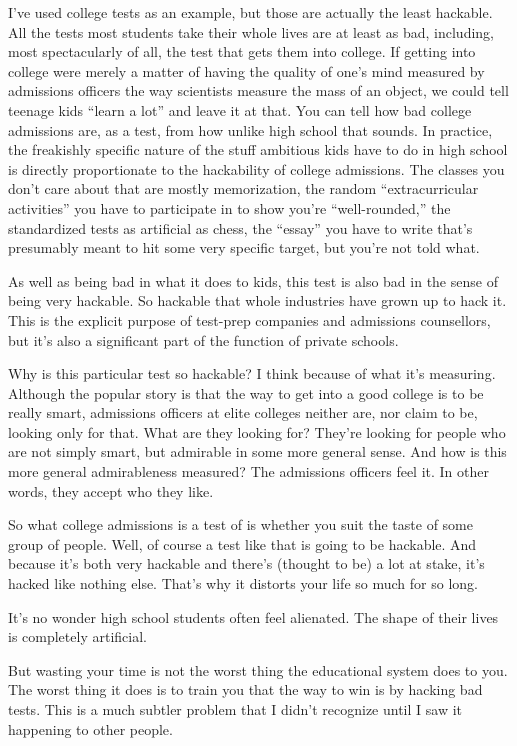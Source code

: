 I've used college tests as an example, but those are actually the least
hackable. All the tests most students take their whole lives are at
least as bad, including, most spectacularly of all, the test that gets
them into college. If getting into college were merely a matter of
having the quality of one's mind measured by admissions officers the way
scientists measure the mass of an object, we could tell teenage kids
``learn a lot'' and leave it at that. You can tell how bad college
admissions are, as a test, from how unlike high school that sounds. In
practice, the freakishly specific nature of the stuff ambitious kids
have to do in high school is directly proportionate to the hackability
of college admissions. The classes you don't care about that are mostly
memorization, the random ``extracurricular activities'' you have to
participate in to show you're ``well-rounded,'' the standardized tests
as artificial as chess, the ``essay'' you have to write that's
presumably meant to hit some very specific target, but you're not told
what.

As well as being bad in what it does to kids, this test is also bad in
the sense of being very hackable. So hackable that whole industries have
grown up to hack it. This is the explicit purpose of test-prep companies
and admissions counsellors, but it's also a significant part of the
function of private schools.

Why is this particular test so hackable? I think because of what it's
measuring. Although the popular story is that the way to get into a good
college is to be really smart, admissions officers at elite colleges
neither are, nor claim to be, looking only for that. What are they
looking for? They're looking for people who are not simply smart, but
admirable in some more general sense. And how is this more general
admirableness measured? The admissions officers feel it. In other words,
they accept who they like.

So what college admissions is a test of is whether you suit the taste of
some group of people. Well, of course a test like that is going to be
hackable. And because it's both very hackable and there's (thought to
be) a lot at stake, it's hacked like nothing else. That's why it
distorts your life so much for so long.

It's no wonder high school students often feel alienated. The shape of
their lives is completely artificial.

But wasting your time is not the worst thing the educational system does
to you. The worst thing it does is to train you that the way to win is
by hacking bad tests. This is a much subtler problem that I didn't
recognize until I saw it happening to other people.

